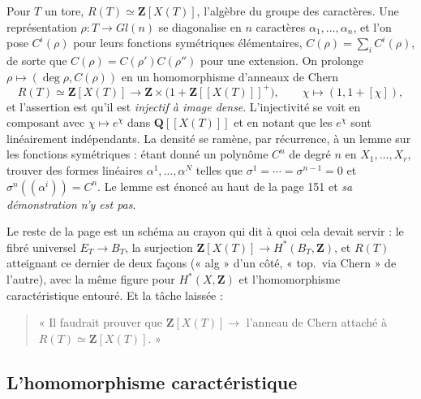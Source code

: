 \documentclass[11pt,a4paper]{article}
\begin{document}
Pour $T$ un tore, $R(T) \simeq \mathbf{Z}[X(T)]$, l'algèbre du groupe des
caractères. Une représentation $\rho \colon T \to Gl(n)$ se diagonalise en $n$
caractères $\alpha_{1}, \ldots, \alpha_{n}$, et l'on pose $C^{i}(\rho)$ pour
leurs fonctions symétriques élémentaires, $C(\rho) = \sum_{i}C^{i}(\rho)$,
de sorte que $C(\rho) = C(\rho')C(\rho'')$ pour une extension. On prolonge
$\rho \mapsto (\deg \rho, C(\rho))$ en un homomorphisme d'anneaux de Chern
\[
R(T) \simeq \mathbf{Z}[X(T)]
\longrightarrow \mathbf{Z} \times \bigl( 1 + \mathbf{Z}[[X(T)]]^{+} \bigr) ,
\qquad
\chi \longmapsto (1, 1 + [\chi]) ,
\]
et l'assertion est qu'il est \emph{injectif à image dense}. L'injectivité se
voit en composant avec $\chi \mapsto e^{\chi}$ dans
$\mathbf{Q}[[X(T)]]$ et en notant que les $e^{\chi}$ sont linéairement
indépendants. La densité se ramène, par récurrence, à un lemme sur les
fonctions symétriques : étant donné un polynôme $C^{n}$ de degré $n$ en
$X_{1}, \ldots, X_{r}$, trouver des formes linéaires $\alpha^{1}, \ldots,
\alpha^{N}$ telles que $\sigma^{1} = \cdots = \sigma^{n-1} = 0$ et
$\sigma^{n}((\alpha^{i})) = C^{n}$. Le lemme est énoncé au haut de la page 151
et \emph{sa démonstration n'y est pas}.

Le reste de la page est un schéma au crayon qui dit à quoi cela devait servir :
le fibré universel $E_{T} \to B_{T}$, la surjection $\mathbf{Z}[X(T)] \to
H^{*}(B_{T}, \mathbf{Z})$, et $R(T)$ atteignant ce dernier de deux façons
(« alg » d'un côté, « top.\ via Chern » de l'autre), avec la même figure pour
$H^{*}(X, \mathbf{Z})$ et l'homomorphisme caractéristique entouré. Et la tâche
laissée :
\begin{quote}
« Il faudrait prouver que $\mathbf{Z}[X(T)] \to$ l'anneau de Chern attaché à
$R(T) \simeq \mathbf{Z}[X(T)]$. »
\end{quote}

\subsection*{L'homomorphisme caractéristique}
\end{document}
